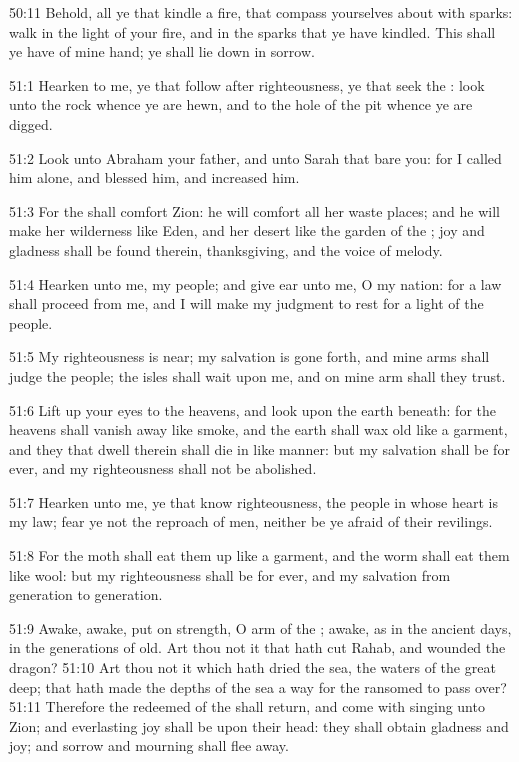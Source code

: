 50:11 Behold, all ye that kindle a fire, that compass yourselves about with sparks: walk in the light of your fire, and in the sparks that ye have kindled. This shall ye have of mine hand; ye shall lie down in sorrow.

51:1 Hearken to me, ye that follow after righteousness, ye that seek the \LORD: look unto the rock whence ye are hewn, and to the hole of the pit whence ye are digged.

51:2 Look unto Abraham your father, and unto Sarah that bare you: for I called him alone, and blessed him, and increased him.

51:3 For the \LORD shall comfort Zion: he will comfort all her waste places; and he will make her wilderness like Eden, and her desert like the garden of the \LORD; joy and gladness shall be found therein, thanksgiving, and the voice of melody.

51:4 Hearken unto me, my people; and give ear unto me, O my nation: for a law shall proceed from me, and I will make my judgment to rest for a light of the people.

51:5 My righteousness is near; my salvation is gone forth, and mine arms shall judge the people; the isles shall wait upon me, and on mine arm shall they trust.

51:6 Lift up your eyes to the heavens, and look upon the earth beneath: for the heavens shall vanish away like smoke, and the earth shall wax old like a garment, and they that dwell therein shall die in like manner: but my salvation shall be for ever, and my righteousness shall not be abolished.

51:7 Hearken unto me, ye that know righteousness, the people in whose heart is my law; fear ye not the reproach of men, neither be ye afraid of their revilings.

51:8 For the moth shall eat them up like a garment, and the worm shall eat them like wool: but my righteousness shall be for ever, and my salvation from generation to generation.

51:9 Awake, awake, put on strength, O arm of the \LORD; awake, as in the ancient days, in the generations of old. Art thou not it that hath cut Rahab, and wounded the dragon?  51:10 Art thou not it which hath dried the sea, the waters of the great deep; that hath made the depths of the sea a way for the ransomed to pass over?  51:11 Therefore the redeemed of the \LORD shall return, and come with singing unto Zion; and everlasting joy shall be upon their head: they shall obtain gladness and joy; and sorrow and mourning shall flee away.

